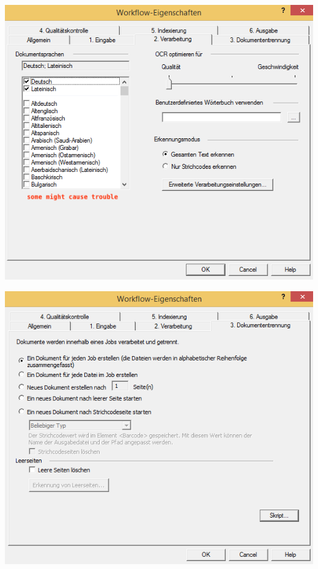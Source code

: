 \begin{minipage}{0.4\textwidth}
\begin{center}
\includegraphics[scale=0.42]{2_verarbeitung.png}
\end{center}
\end{minipage}
\begin{minipage}{0.4\textwidth}
\begin{center}
\includegraphics[scale=0.42]{3_dokumententrennung.png}
\end{center}
\end{minipage}


